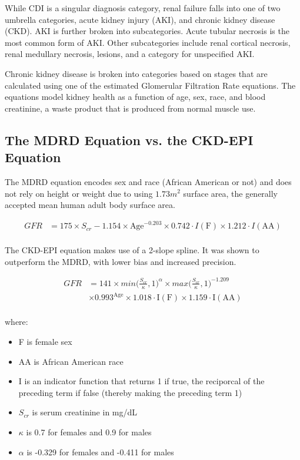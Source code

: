 While CDI is a singular diagnosis category, renal failure falls into one of two umbrella categories, acute kidney injury (AKI), 
and chronic kidney disease (CKD). AKI is further broken into subcategories. Acute tubular necrosis is the most common form of AKI.
Other subcategories include renal cortical necrosis, renal medullary necrosis, lesions, and a category for unspecified AKI. 

Chronic kidney disease is broken into categories based on stages that are calculated using one of the estimated Glomerular Filtration Rate
equations. The equations model kidney health as a function of age, sex, race, and blood creatinine, a waste product that is produced from
normal muscle use. 

\subsection{The MDRD Equation vs. the CKD-EPI Equation}

The MDRD equation encodes sex and race (African American or not) and does not rely on height or weight due to using $1.73m^2$ surface area,
the generally accepted mean human adult body surface area. 

\begin{equation} \label{mdrd}
\begin{split}
  GFR  &= 175 \times S_{cr} - 1.154 \times \text{Age}^{-0.203} \times 0.742 \cdot I(\text{F}) \times 1.212 \cdot I(\text{AA}) \\
\end{split}
\end{equation}

The CKD-EPI equation makes use of a 2-slope spline. It was shown to outperform the MDRD, with lower bias and increased precision.  \cite{Levey2009, eGFR2018}

\begin{equation} \label{ckdepi}
\begin{split}
  GFR &= 141 \times min\bigg(\frac{S_{cr}}{\kappa}, 1\bigg)^{\alpha} \times max\bigg(\frac{S_{cr}}{\kappa}, 1\bigg)^{-1.209} \\
      &\times 0.993^{\text{Age}} \times 1.018 \cdot \text{I}(\text{F}) \times 1.159 \cdot \text{I}(\text{AA}) \\
\end{split}
\end{equation}

where:
\begin{itemize}
  \item F is female sex
  \item AA is African American race
  \item I is an indicator function that returns 1 if true, the reciporcal of the preceding term if false (thereby making the preceding term 1)
  \item $S_{cr}$ is serum creatinine in mg/dL
  \item $\kappa$ is 0.7 for females and 0.9 for males
  \item $\alpha$ is -0.329 for females and -0.411 for males
\end{itemize}


